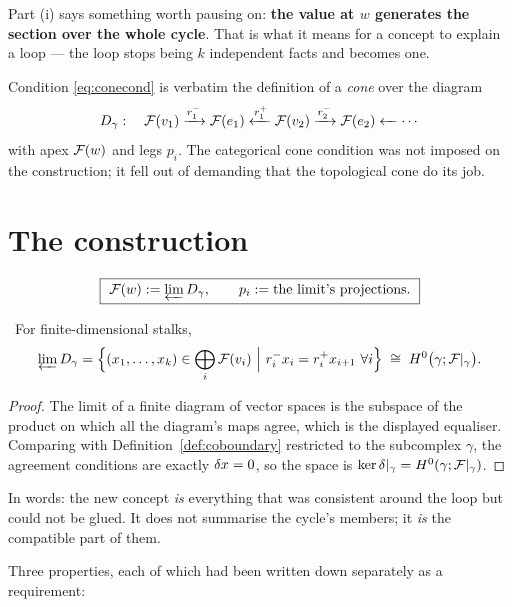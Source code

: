 \begin{intu}\Intu
Part (i) says something worth pausing on: \textbf{the value at $w$
generates the section over the whole cycle}. That is what it means for a
concept to explain a loop --- the loop stops being $k$ independent facts
and becomes one.
\end{intu}

Condition \eqref{eq:conecond} is verbatim the definition of a
\emph{cone} over the diagram
\[
  D_\gamma:\quad
  \stalk{v_1}\xrightarrow{r_1^-}\stalk{e_1}\xleftarrow{r_1^+}
  \stalk{v_2}\xrightarrow{r_2^-}\stalk{e_2}\xleftarrow{\ \ }\cdots
\]
with apex $\mathcal{F}(w)$ and legs $p_i$. The categorical cone condition was
not imposed on the construction; it fell out of demanding that the
topological cone do its job.

\section{The construction}

\begin{construction}\label{con:coned}
\[
  \boxed{\ \mathcal{F}(w):=\varprojlim D_\gamma,
  \qquad p_i:=\text{the limit's projections.}\ }
\]
\end{construction}

\begin{proposition}\label{prop:conelim}
\Proved\ For finite-dimensional stalks,
\[
  \varprojlim D_\gamma
  =\Bigl\{(x_1,\dots,x_k)\in\bigoplus_i\mathcal{F}(v_i)\ \Big|\
    r_i^-x_i=r_i^+x_{i+1}\ \forall i\Bigr\}
  \;\cong\;H^0\bigl(\gamma;\mathcal{F}|_\gamma\bigr).
\]
\end{proposition}
\begin{proof}
The limit of a finite diagram of vector spaces is the subspace of the
product on which all the diagram's maps agree, which is the displayed
equaliser. Comparing with Definition~\ref{def:coboundary} restricted to
the subcomplex $\gamma$, the agreement conditions are exactly
$\delta x=0$, so the space is $\ker\delta|_\gamma=H^0(\gamma;\mathcal{F}|_\gamma)$.
\end{proof}

\begin{intu}\Intu
In words: the new concept \emph{is} everything that was consistent
around the loop but could not be glued. It does not summarise the
cycle's members; it \emph{is} the compatible part of them.
\end{intu}

Three properties, each of which had been written down separately as a
requirement:

